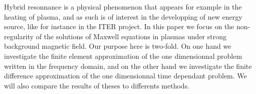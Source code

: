 Hybrid resonnance is a physical phenomenon that appears for example in the heating of plasma, and as such is of interest in the developping of new energy source, like for instance in the ITER project. In this paper we focus on the  non-regularity of
the solutions of Maxwell equations in plasmas under strong background magnetic field. Our purpose here is two-fold. On one hand we investigate the finite element approximation of the one dimensionnal problem written in the frequency domain, and on the other hand we investigate the finite difference approximation of the one dimensionnal time dependant problem. We will also compare the results of theses to differents methods.